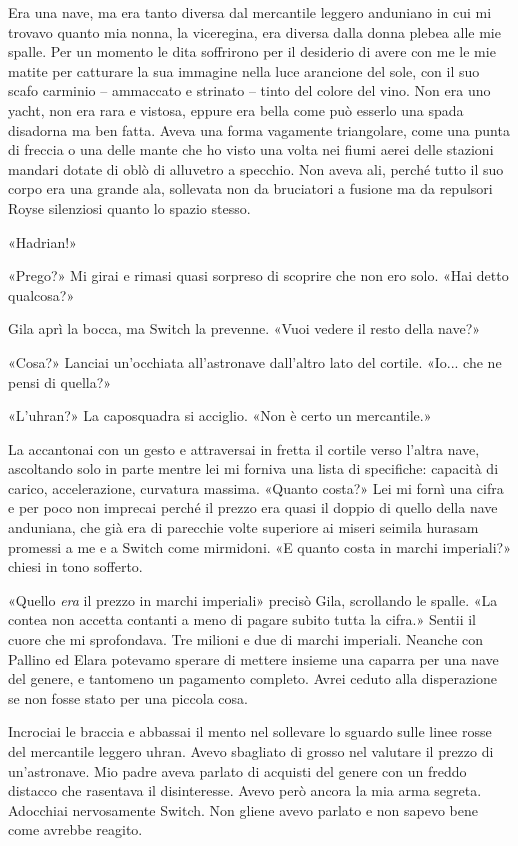Era una nave, ma era tanto diversa dal mercantile leggero anduniano in
cui mi trovavo quanto mia nonna, la viceregina, era diversa dalla donna
plebea alle mie spalle. Per un momento le dita soffrirono per il
desiderio di avere con me le mie matite per catturare la sua immagine
nella luce arancione del sole, con il suo scafo carminio -- ammaccato e
strinato -- tinto del colore del vino. Non era uno yacht, non era rara e
vistosa, eppure era bella come può esserlo una spada disadorna ma ben
fatta. Aveva una forma vagamente triangolare, come una punta di freccia
o una delle mante che ho visto una volta nei fiumi aerei delle stazioni
mandari dotate di oblò di alluvetro a specchio. Non aveva ali, perché
tutto il suo corpo era una grande ala, sollevata non da bruciatori a
fusione ma da repulsori Royse silenziosi quanto lo spazio stesso.

«Hadrian!»

«Prego?» Mi girai e rimasi quasi sorpreso di scoprire che non ero solo.
«Hai detto qualcosa?»

Gila aprì la bocca, ma Switch la prevenne. «Vuoi vedere il resto della
nave?»

«Cosa?» Lanciai un'occhiata all'astronave dall'altro lato del cortile.
«Io... che ne pensi di quella?»

«L'uhran?» La caposquadra si acciglio. «Non è certo un mercantile.»

La accantonai con un gesto e attraversai in fretta il cortile verso
l'altra nave, ascoltando solo in parte mentre lei mi forniva una lista
di specifiche: capacità di carico, accelerazione, curvatura massima.
«Quanto costa?» Lei mi fornì una cifra e per poco non imprecai perché il
prezzo era quasi il doppio di quello della nave anduniana, che già era
di parecchie volte superiore ai miseri seimila hurasam promessi a me e a
Switch come mirmidoni. «E quanto costa in marchi imperiali?» chiesi in
tono sofferto.

«Quello \emph{era} il prezzo in marchi imperiali» precisò Gila,
scrollando le spalle. «La contea non accetta contanti a meno di pagare
subito tutta la cifra.» Sentii il cuore che mi sprofondava. Tre milioni
e due di marchi imperiali. Neanche con Pallino ed Elara potevamo sperare
di mettere insieme una caparra per una nave del genere, e tantomeno un
pagamento completo. Avrei ceduto alla disperazione se non fosse stato
per una piccola cosa.

Incrociai le braccia e abbassai il mento nel sollevare lo sguardo sulle
linee rosse del mercantile leggero uhran. Avevo sbagliato di grosso nel
valutare il prezzo di un'astronave. Mio padre aveva parlato di acquisti
del genere con un freddo distacco che rasentava il disinteresse. Avevo
però ancora la mia arma segreta. Adocchiai nervosamente Switch. Non
gliene avevo parlato e non sapevo bene come avrebbe reagito.

